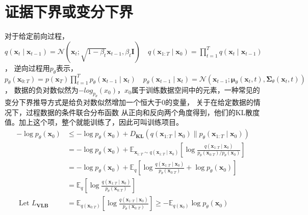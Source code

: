 \documentclass[lang=cn,newtx,10pt,scheme=chinese]{elegantbook}
\begin{document}
\section{证据下界或变分下界}
对于给定前向过程，
$q\left(\mathbf{x}_t \mid \mathbf{x}_{t-1}\right)=\mathcal{N}\left(\mathbf{x}_t ; \sqrt{1-\beta_t} \mathbf{x}_{t-1}, 
\beta_t \mathbf{I}\right) \quad q\left(\mathbf{x}_{1: T} \mid \mathbf{x}_0\right)=
\prod_{t=1}^T q\left(\mathbf{x}_t \mid \mathbf{x}_{t-1}\right)$，
逆向过程用$p_{\theta}$表示，
$p_\theta\left(\mathbf{x}_{0: T}\right)=p\left(\mathbf{x}_T\right) 
\prod_{t=1}^T p_\theta\left(\mathbf{x}_{t-1} \mid \mathbf{x}_t\right) \quad p_\theta\left(\mathbf{x}_{t-1} \mid \mathbf{x}_t\right)=
\mathcal{N}\left(\mathbf{x}_{t-1} ; 
\boldsymbol{\mu}_\theta\left(\mathbf{x}_t, t\right), \mathbf{\Sigma}_\theta\left(\mathbf{x}_t, t\right)\right)
$，
数据的负对数似然为$-log_{p_{\theta}}(x_0)$，$x_0$属于训练数据空间中的元素，一种常见的变分下界推导方式是给负对数似然增加一个恒大于0的变量，
关于在给定数据的情况下，过程数据的条件联合分布函数 从正向和反向两个角度得到，他们的KL散度值。加上这个项，整个就能训练了，因此可叫训练项目。
\begin{equation}
  \begin{aligned}
    -\log p_\theta\left(\mathbf{x}_0\right) 
    & \leq-\log p_\theta\left(\mathbf{x}_0\right)+D_{\mathbf{KL}}\left(q\left(\mathbf{x}_{1: T} \mid \mathbf{x}_0\right) \| p_\theta\left(\mathbf{x}_{1: T} \mid \mathbf{x}_0\right)\right) \\ 
    & =-\log p_\theta\left(\mathbf{x}_0\right)+\mathbb{E}_{\mathbf{x}_{1: T} \sim q\left(\mathbf{x}_{1: T} \mid \mathbf{x}_0\right)}\left[\log \frac{q\left(\mathbf{x}_{1: T} 
    \mid \mathbf{x}_0\right)}{p_\theta\left(\mathbf{x}_{0: T}\right) / p_\theta\left(\mathbf{x}_0\right)}\right] \\ 
    & =-\log p_\theta\left(\mathbf{x}_0\right)+\mathbb{E}_q\left[\log \frac{q\left(\mathbf{x}_{1: T} \mid \mathbf{x}_0\right)}{p_\theta\left(\mathbf{x}_{0: T}\right)}+\log p_\theta\left(\mathbf{x}_0\right)\right] \\ 
    & =\mathbb{E}_q\left[\log \frac{q\left(\mathbf{x}_{1: T} \mid \mathbf{x}_0\right)}{p_\theta\left(\mathbf{x}_{0: T}\right)}\right] \\ \text { Let } L_{\mathbf{VLB}} & =\mathbb{E}_{q\left(\mathbf{x}_{0: T}\right)}
    \left[\log \frac{q\left(\mathbf{x}_{1: T} \mid \mathbf{x}_0\right)}{p_\theta\left(\mathbf{x}_{0: T}\right)}\right] 
    \geq-\mathbb{E}_{q\left(\mathbf{x}_0\right)} \log p_\theta\left(\mathbf{x}_0\right)
  \end{aligned}
\end{equation}
\end{document}
